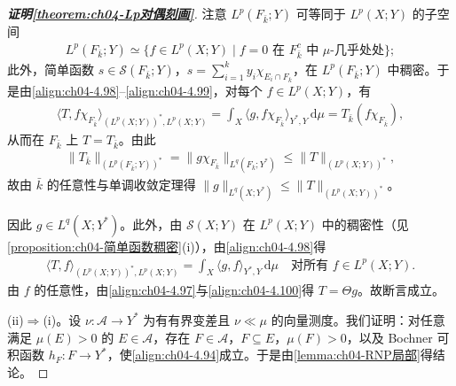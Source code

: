 \documentclass[../../main.tex]{subfiles}%
\begin{document}
\begin{proof}[\textbf{证明\cref{theorem:ch04-Lp对偶刻画}}]
注意 $L^p(F_{\bar k};Y)$ 可等同于 $L^p(X;Y)$ 的子空间
\begin{align*}
L^p(F_{\bar k};Y)\simeq\{f\in L^p(X;Y)\mid f=0\text{ 在 }F_{\bar k}^c\text{ 中 }\mu\text{-几乎处处}\};
\end{align*}
此外，简单函数 $s\in\mathcal{S}(F_{\bar k};Y)$，$s=\sum_{i=1}^k y_i\chi_{E_i\cap F_{\bar k}}$，在 $L^p(F_{\bar k};Y)$ 中稠密。于是由\eqref{align:ch04-4.98}--\eqref{align:ch04-4.99}，对每个 $f\in L^p(X;Y)$，有
\begin{align*}
\langle T,f\chi_{F_{\bar k}}\rangle_{(L^p(X;Y))^*,L^p(X;Y)}=\int_X\langle g,f\chi_{F_{\bar k}}\rangle_{Y^*,Y}\,\mathrm{d}\mu=T_{\bar k}(f\chi_{F_{\bar k}}),
\end{align*}
从而在 $F_{\bar k}$ 上 $T=T_{\bar k}$。由此
\begin{align*}
\|T_{\bar k}\|_{(L^p(F_{\bar k};Y))^*}=\|g\chi_{F_{\bar k}}\|_{L^q(F_{\bar k};Y^*)}\leqslant\|T\|_{(L^p(X;Y))^*},
\end{align*}
故由 $\bar k$ 的任意性与单调收敛定理得 $\|g\|_{L^q(X;Y^*)}\leqslant\|T\|_{(L^p(X;Y))^*}$。

因此 $g\in L^q(X;Y^*)$。此外，由 $\mathcal{S}(X;Y)$ 在 $L^p(X;Y)$ 中的稠密性（见\cref{proposition:ch04-简单函数稠密}(i)），由\eqref{align:ch04-4.98}得
\begin{align}
\langle T,f\rangle_{(L^p(X;Y))^*,L^p(X;Y)}=\int_X\langle g,f\rangle_{Y^*,Y}\,\mathrm{d}\mu\quad\text{对所有 }f\in L^p(X;Y). \label{align:ch04-4.100}
\end{align}
由 $f$ 的任意性，由\eqref{align:ch04-4.97}与\eqref{align:ch04-4.100}得 $T=\Theta g$。故断言成立。

(ii)$\Rightarrow$(i)。设 $\nu:\mathcal{A}\to Y^*$ 为有有界变差且 $\nu\ll\mu$ 的向量测度。我们证明：对任意满足 $\mu(E)>0$ 的 $E\in\mathcal{A}$，存在 $F\in\mathcal{A}$，$F\subseteq E$，$\mu(F)>0$，以及 Bochner 可积函数 $h_F:F\to Y^*$，使\eqref{align:ch04-4.94}成立。于是由\cref{lemma:ch04-RNP局部}得结论。


\end{proof}
\end{document}
